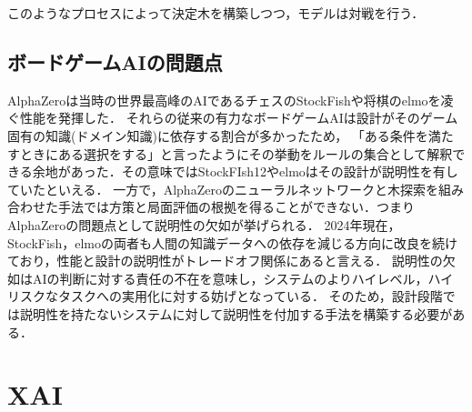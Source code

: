 	
このようなプロセスによって決定木を構築しつつ，モデルは対戦を行う．



\subsection{ボードゲームAIの問題点}
AlphaZeroは当時の世界最高峰のAIであるチェスのStockFish\cite{StockFish}や将棋のelmo\cite{elmo}を凌ぐ性能を発揮した．
それらの従来の有力なボードゲームAIは設計がそのゲーム固有の知識(ドメイン知識)に依存する割合が多かったため，
「ある条件を満たすときにある選択をする」と言ったようにその挙動をルールの集合として解釈できる余地があった．その意味ではStockFIsh12やelmoはその設計が説明性を有していたといえる．
一方で，AlphaZeroのニューラルネットワークと木探索を組み合わせた手法では方策と局面評価の根拠を得ることができない．つまりAlphaZeroの問題点として説明性の欠如が挙げられる．
2024年現在，StockFish，elmoの両者も人間の知識データへの依存を減じる方向に改良を続けており，性能と設計の説明性がトレードオフ関係にあると言える\cite{elmo}\cite{StockFish13}．
説明性の欠如はAIの判断に対する責任の不在を意味し，システムのよりハイレベル，ハイリスクなタスクへの実用化に対する妨げとなっている．
そのため，設計段階では説明性を持たないシステムに対して説明性を付加する手法を構築する必要がある．




\section{XAI}

